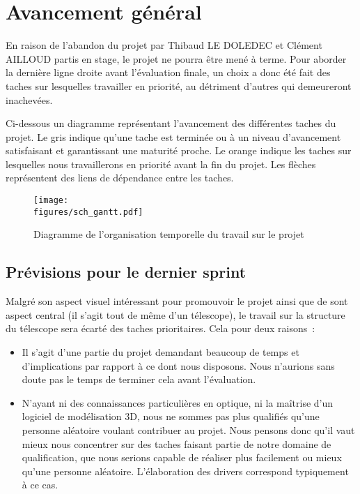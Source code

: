 \chapter{Avancement général}

En raison de l'abandon du projet par Thibaud LE DOLEDEC et Clément AILLOUD partis en stage, le projet ne pourra être mené à terme. Pour aborder la dernière ligne droite avant l'évaluation finale, un choix a donc été fait des taches sur lesquelles travailler en priorité, au détriment d'autres qui demeureront inachevées.

\vspace{1cm}

Ci-dessous un diagramme représentant l’avancement des différentes taches du projet. Le gris indique qu’une tache est terminée ou à un niveau d’avancement satisfaisant et garantissant une maturité proche. Le orange indique les taches sur lesquelles nous travaillerons en priorité avant la fin du projet. Les flèches représentent des liens de dépendance entre les taches.

\begin{figure}[H]
    \centering
	\texttt{[image: \\figures/sch\_gantt.pdf]}
    \decoRule
    \caption[
    Diagramme de l'organisation temporelle du travail sur le projet]{
    Diagramme de l'organisation temporelle du travail sur le projet}
    \label{fig:Diagramme de l'organisation temporelle du travail sur le projet}
    \end{figure}

\section{Prévisions pour le dernier sprint}

Malgré son aspect visuel intéressant pour promouvoir le projet ainsi que de sont aspect central (il s'agit tout de même d'un télescope), le travail sur la structure du télescope sera écarté des taches prioritaires. Cela pour deux raisons~:
\begin{itemize}[label=$\bullet$]
	\item Il s'agit d'une partie du projet demandant beaucoup de temps et d'implications par rapport à ce dont nous disposons. Nous n'aurions sans doute pas le temps de terminer cela avant l'évaluation.
	\item N'ayant ni des connaissances particulières en optique, ni la maîtrise d'un logiciel de modélisation 3D, nous ne sommes pas plus qualifiés qu'une personne aléatoire voulant contribuer au projet. Nous pensons donc qu'il vaut mieux nous concentrer sur des taches faisant partie de notre domaine de qualification, que nous serions capable de réaliser plus facilement ou mieux qu'une personne aléatoire. L'élaboration des drivers correspond typiquement à ce cas.
	\end{itemize}

